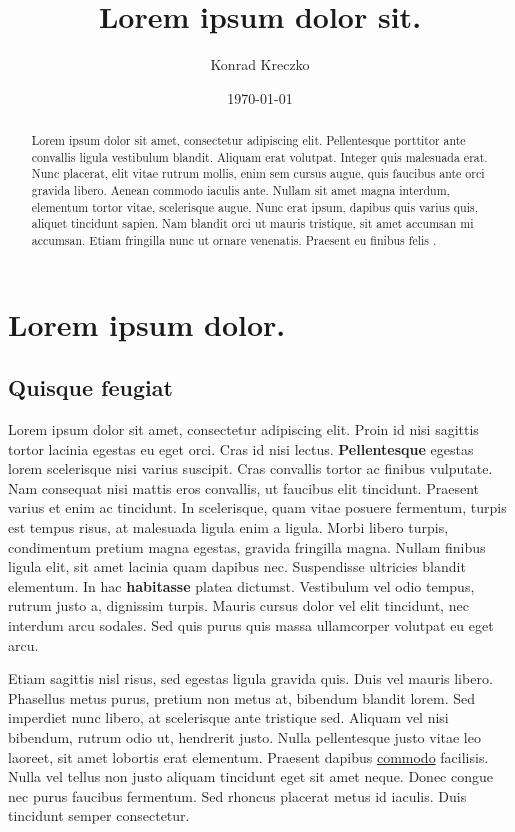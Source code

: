\documentclass[a4paper, 12pt]{article}
\begin{document}
\title{Lorem ipsum dolor sit.}
\author{Konrad Kreczko}
\date{\today}

\tableofcontents
\newpage



\maketitle
\newpage
\begin{abstract}
Lorem ipsum dolor sit amet, consectetur adipiscing elit. Pellentesque porttitor ante convallis ligula vestibulum blandit. Aliquam erat volutpat. Integer quis malesuada erat. Nunc placerat, elit vitae rutrum mollis, enim sem cursus augue, quis faucibus ante orci gravida libero. Aenean commodo iaculis ante. Nullam sit amet magna interdum, elementum tortor vitae, scelerisque augue. Nunc erat ipsum, dapibus quis varius quis, aliquet tincidunt sapien. Nam blandit orci ut mauris tristique, sit amet accumsan mi accumsan. Etiam fringilla nunc ut ornare venenatis. Praesent eu finibus felis \cite{5}.
\end{abstract}
\newpage
\section{Lorem ipsum dolor.}
\subsection{Quisque feugiat}
Lorem ipsum dolor sit amet, consectetur adipiscing elit. Proin id nisi sagittis tortor lacinia egestas eu eget orci. Cras id nisi lectus. \textbf{Pellentesque} egestas lorem scelerisque nisi varius suscipit. Cras convallis tortor ac finibus vulputate. Nam consequat nisi mattis eros convallis, ut faucibus elit tincidunt. Praesent varius et enim ac tincidunt. In scelerisque, quam vitae posuere fermentum, turpis est tempus risus, at malesuada ligula enim a ligula. Morbi libero turpis, condimentum pretium magna egestas, gravida fringilla magna. Nullam finibus ligula elit, sit amet lacinia quam dapibus nec. Suspendisse ultricies blandit elementum. In hac \textbf{habitasse} platea dictumst. Vestibulum vel odio tempus, rutrum justo a, dignissim turpis. Mauris cursus dolor vel elit tincidunt, nec interdum arcu sodales. Sed quis purus quis massa ullamcorper volutpat eu eget arcu.

Etiam sagittis nisl risus, sed egestas \cite{6} ligula gravida quis. Duis vel mauris libero. Phasellus metus purus, pretium non metus at, bibendum blandit lorem. Sed imperdiet nunc libero, at scelerisque ante tristique sed. Aliquam vel nisi bibendum, rutrum odio ut, hendrerit justo. Nulla pellentesque justo vitae leo laoreet, sit amet lobortis erat elementum. Praesent dapibus \underline{commodo} facilisis. Nulla vel tellus non justo aliquam tincidunt eget sit amet neque. Donec congue nec purus faucibus fermentum. Sed rhoncus placerat metus id iaculis. Duis tincidunt semper consectetur.
\end{document}
